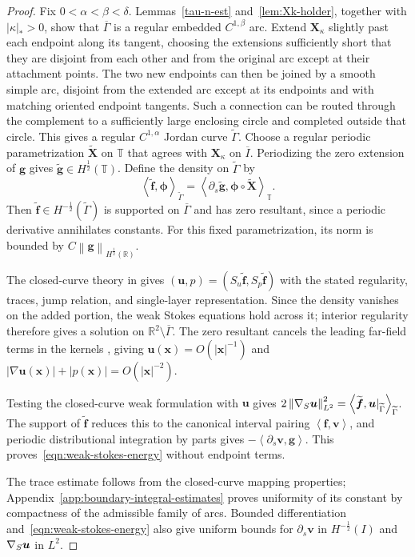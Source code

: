 \documentclass[11pt,reqno]{amsart}
\theoremstyle{plain}
\theoremstyle{definition}
\numberwithin{equation}{section}
\newcommand{\p}{\partial}
\newcommand{\grad}[1]{\nabla #1}
\newcommand{\wt}[1]{\widetilde{#1}}
\newcommand{\bm}[1]{\boldsymbol{#1}}
\newcommand{\abs}[1]{\left\lvert #1 \right\rvert}
\newcommand{\norm}[1]{\left\lVert #1 \right\rVert}
\newcommand{\dual}[2]{\left\langle #1,#2 \right\rangle}
\newcommand{\R}{\mathbb{R}}
\newcommand{\xk}{\bm X_\kappa}
\newcommand{\hr}[1]{H^{#1}(\R)}
\begin{document}
\begin{proof}
Fix $0<\alpha<\beta<\delta$. Lemmas~\ref{tau-n-est}
and~\ref{lem:Xk-holder}, together with $\abs{\kappa}_*>0$, show that
$\overline{\Gamma}$ is a regular embedded $C^{1,\beta}$ arc. Extend $\xk$ slightly past each endpoint along its tangent,
choosing the extensions sufficiently short that they are disjoint from each
other and from the original arc except at their attachment points.
The two new endpoints can then be joined by a smooth simple arc, disjoint
from the extended arc except at its endpoints and with matching oriented
endpoint tangents. Such a connection can be routed through the complement
to a sufficiently large enclosing circle and completed outside that circle.
This gives a regular $C^{1,\alpha}$ Jordan curve $\wt\Gamma$.
Choose a regular periodic parametrization $\wt{\bm X}$ on $\mathbb T$
that agrees with $\xk$ on $\overline I$. Periodizing the zero extension of
$\bm g$ gives $\wt{\bm g}\in H^{\frac12}(\mathbb T)$. Define the density
on $\wt\Gamma$ by
\begin{equation*}
    \dual{\wt{\bm f}}{\bm\phi}_{\wt\Gamma}
    =\dual{\p_s\wt{\bm g}}{\bm\phi\circ\wt{\bm X}}_{\mathbb T}.
\end{equation*}
Then $\wt{\bm f}\in H^{-\frac12}(\wt\Gamma)$ is supported on $\overline{\Gamma}$
and has zero resultant, since a periodic derivative annihilates constants.
For this fixed parametrization, its norm is bounded by
$C\norm{\bm g}_{\hr{\frac12}}$.

The closed-curve theory in
\cite[Propositions~7.1--7.3 and~9.2--9.3]{SayasSelgas2014} gives
$(\bm u,p)=(S_u\wt{\bm f},S_p\wt{\bm f})$ with the stated regularity,
traces, jump relation, and single-layer representation. Since the density
vanishes on the added portion, the weak Stokes equations hold across it;
interior regularity therefore gives a solution on $\R^2\setminus\overline{\Gamma}$.
The zero resultant cancels the leading far-field terms in the kernels
\cite[(9.1) and~(9.4)--(9.5)]{SayasSelgas2014}, giving
$\bm u(\bm x)=O(|\bm x|^{-1})$ and
$|\grad\bm u(\bm x)|+|p(\bm x)|=O(|\bm x|^{-2})$.

Testing the closed-curve weak formulation
\cite[(7.6)]{SayasSelgas2014} with $\bm u$ gives
$2\norm{\grad_S\bm u}_{L^2}^2
=\dual{\wt{\bm f}}{\bm u|_{\wt\Gamma}}_{\wt\Gamma}$.
The support of $\wt{\bm f}$ reduces this to the canonical interval
pairing $\dual{\bm f}{\bm v}$, and periodic distributional integration
by parts gives $-\dual{\p_s\bm v}{\bm g}$.
This proves~\eqref{eqn:weak-stokes-energy} without endpoint terms.

The trace estimate follows from the closed-curve mapping properties;
Appendix~\ref{app:boundary-integral-estimates} proves uniformity of its
constant by compactness of the admissible family of arcs.
Bounded differentiation and~\eqref{eqn:weak-stokes-energy} also give uniform
bounds for $\p_s\bm v$ in $H^{-\frac12}(I)$ and $\grad_S\bm u$ in $L^2$.
\end{proof}
\end{document}
